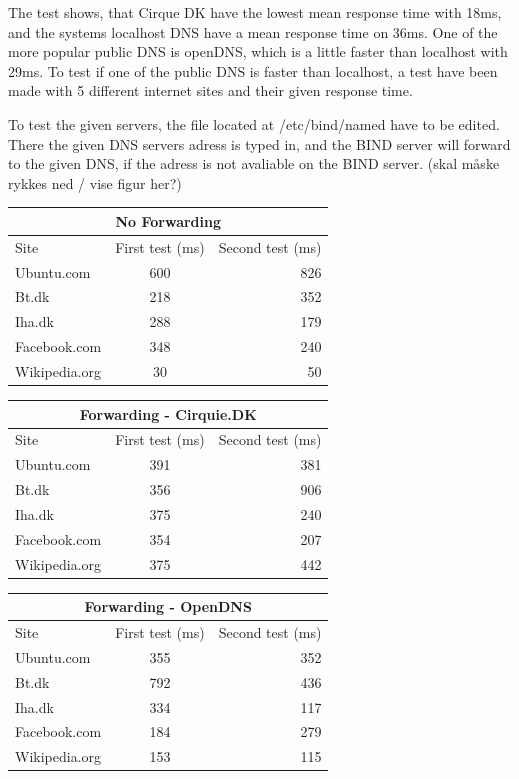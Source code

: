 \documentclass[Preamble]{subfiles}
\begin{document}
The test shows, that Cirque DK have the lowest mean response time with 18ms, and the systems localhost DNS have a mean response time on 36ms. One of the more popular public DNS is openDNS, which is a little faster than localhost with 29ms. To test if one of the public DNS is faster than localhost, a test have been made with 5 different internet sites and their given response time. 

To test the given servers, the file located at /etc/bind/named have to be edited. There the given DNS servers adress is typed in, and the BIND server will forward to the given DNS, if the adress is not avaliable on the BIND server. (skal måske rykkes ned / vise figur her?)


\begin{center}
  \begin{tabular}{ l | c  | r}
    \multicolumn{3}{c}{No Forwarding}  \\
	\hline Site & First test (ms) & Second test (ms) \\     
    \hline
    Ubuntu.com & 600 & 826  \\ \hline
    Bt.dk & 218 & 352  \\ \hline
	Iha.dk & 288 & 179 \\ \hline
	Facebook.com & 348 &	240 \\ \hline
	Wikipedia.org & 30 &	50 \\ \hline
  \end{tabular}
\end{center}

\begin{center}
  \begin{tabular}{ l | c  | r}
    \multicolumn{3}{c}{Forwarding - Cirquie.DK}  \\
	\hline Site & First test (ms) & Second test (ms) \\     
    \hline
    Ubuntu.com & 391 & 381  \\ \hline
    Bt.dk & 356 & 906  \\ \hline
	Iha.dk & 375 & 240 \\ \hline
	Facebook.com & 354 &	207 \\ \hline
	Wikipedia.org & 375 & 442 \\ \hline
  \end{tabular}
\end{center}

\begin{center}
  \begin{tabular}{ l | c  | r}
    \multicolumn{3}{c}{Forwarding - OpenDNS}  \\
	\hline Site & First test (ms) & Second test (ms) \\     
    \hline
    Ubuntu.com & 355 & 352  \\ \hline
    Bt.dk & 792 & 436  \\ \hline
	Iha.dk & 334 & 117 \\ \hline
	Facebook.com & 184 & 279 \\ \hline
	Wikipedia.org & 153 & 115 \\ \hline
  \end{tabular}
\end{center}
\end{document}
